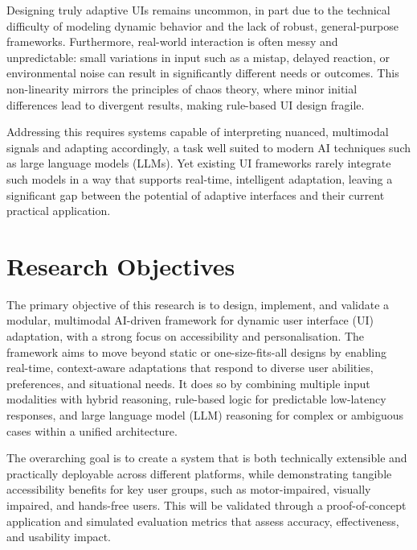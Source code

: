 \documentclass[openany]{book}
\begin{document}
Designing truly adaptive UIs remains uncommon, in part due to the technical difficulty of modeling dynamic behavior and the lack of robust, general-purpose frameworks. Furthermore, real-world interaction is often messy and unpredictable: small variations in input such as a mistap, delayed reaction, or environmental noise can result in significantly different needs or outcomes. This non-linearity mirrors the principles of chaos theory, where minor initial differences lead to divergent results, making rule-based UI design fragile.

Addressing this requires systems capable of interpreting nuanced, multimodal signals and adapting accordingly, a task well suited to modern AI techniques such as large language models (LLMs). Yet existing UI frameworks rarely integrate such models in a way that supports real-time, intelligent adaptation, leaving a significant gap between the potential of adaptive interfaces and their current practical application.

\newpage

\section{Research Objectives}

The primary objective of this research is to design, implement, and validate a modular, multimodal AI-driven framework for dynamic user interface (UI) adaptation, with a strong focus on accessibility and personalisation. The framework aims to move beyond static or one-size-fits-all designs by enabling real-time, context-aware adaptations that respond to diverse user abilities, preferences, and situational needs. It does so by combining multiple input modalities with hybrid reasoning, rule-based logic for predictable low-latency responses, and large language model (LLM) reasoning for complex or ambiguous cases within a unified architecture.  

The overarching goal is to create a system that is both technically extensible and practically deployable across different platforms, while demonstrating tangible accessibility benefits for key user groups, such as motor-impaired, visually impaired, and hands-free users. This will be validated through a proof-of-concept application and simulated evaluation metrics that assess accuracy, effectiveness, and usability impact.
\end{document}
